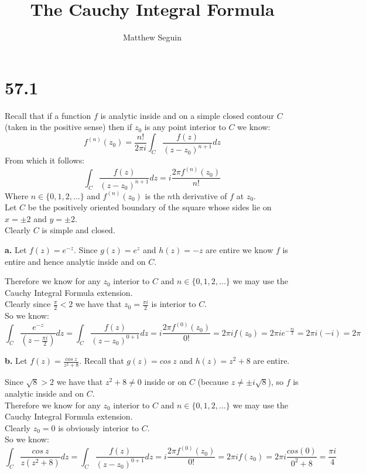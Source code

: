 \documentclass{article}
\title{The Cauchy Integral Formula}
\author{Matthew Seguin}
\date{}
\begin{document}
\maketitle

\section*{57.1}
\begin{center}
    \doublespacing
    Recall that if a function $f$ is analytic inside and on a simple closed contour $C$ (taken in the positive sense) then if $z_0$ is any point interior to $C$ we know:
    \[f^{(n)} (z_0) =\frac{n!}{2\pi i}\int _C\frac{f(z)}{(z - z_0)^{n+1}} dz\]
    From which it follows:
    \[\int _C\frac{f(z)}{(z - z_0)^{n+1}} dz = i\frac{2\pi f^{(n)} (z_0)}{n!}\]
    Where $n\in\{0, 1, 2, ...\}$ and $f^{(n)} (z_0)$ is the $n$th derivative of $f$ at $z_0$.
    \\Let $C$ be the positively oriented boundary of the square whose sides lie on $x =\pm 2$ and $y =\pm 2$.
    \\Clearly $C$ is simple and closed.
\end{center}

{\Large\textbf{a.}} Let $f(z) = e^{-z}$. Since $g(z) = e^z$ and $h(z) = -z$ are entire we know $f$ is entire and hence analytic inside and on $C$.
\begin{center}
    \doublespacing
    Therefore we know for any $z_0$ interior to $C$ and $n\in\{0, 1, 2, ...\}$ we may use the Cauchy Integral Formula extension.
    \\Clearly since $\frac{\pi}{2} < 2$ we have that $z_0 =\frac{\pi i}{2}$ is interior to $C$.
    \\So we know:
    \[\int _C\frac{e^{-z}}{(z -\frac{\pi i}{2})} dz =\int _C\frac{f(z)}{(z - z_0)^{0+1}} dz = i\frac{2\pi f^{(0)} (z_0)}{0!} = 2\pi i f(z_0) = 2\pi i e^{-\frac{\pi i}{2}} = 2\pi i (-i) = 2\pi\]
    \qedsymbol
\end{center}

{\Large\textbf{b.}} Let $f(z) =\frac{cos\:z}{z^2 + 8}$. Recall that $g(z) = cos\:z$ and $h(z) = z^2 + 8$ are entire.
\begin{center}
    \doublespacing
    Since $\sqrt{8} > 2$ we have that $z^2 + 8\neq 0$ inside or on $C$ (because $z\neq\pm i\sqrt{8}$), so $f$ is analytic inside and on $C$.
    \\Therefore we know for any $z_0$ interior to $C$ and $n\in\{0, 1, 2, ...\}$ we may use the Cauchy Integral Formula extension.
    \\Clearly $z_0 = 0$ is obviously interior to $C$.
    \\So we know:
    \[\int _C\frac{cos\:z}{z(z^2 + 8)} dz =\int _C\frac{f(z)}{(z - z_0)^{0+1}} dz = i\frac{2\pi f^{(0)} (z_0)}{0!} = 2\pi i f(z_0) = 2\pi i\frac{cos(0)}{0^2 + 8} =\frac{\pi i}{4}\]
    \qedsymbol
\end{center}
\end{document}
